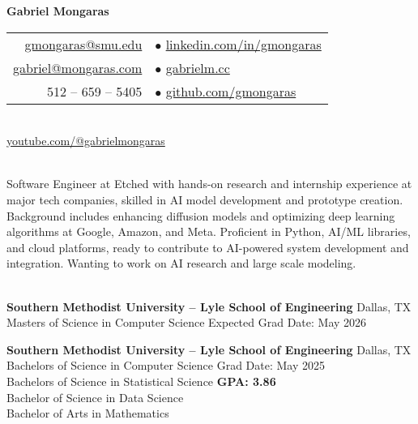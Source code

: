 \documentclass[a4paper,10pt]{article}
\begin{document}
\begin{center}
    {\LARGE \textbf{Gabriel Mongaras}} \\
    \vspace{10pt}
    \begin{tabular}{r l}
        \href{mailto:gmongaras@smu.edu}{gmongaras@smu.edu} \quad & $\bullet$ \quad \href{https://www.linkedin.com/in/gmongaras}{linkedin.com/in/gmongaras} \\
        \href{mailto:gabriel@mongaras.com}{gabriel@mongaras.com} \quad & $\bullet$ \quad \href{https://gabrielm.cc/}{gabrielm.cc} \\
        512 – 659 – 5405 \quad & $\bullet$ \quad \href{https://github.com/gmongaras}{github.com/gmongaras} \\
    \end{tabular} \\
    \href{https://www.youtube.com/@gabrielmongaras}{youtube.com/@gabrielmongaras} \\
\end{center}

\noindent\hrulefill

 \vspace{1pt} \\
Software Engineer at Etched with hands-on research and internship experience at major tech companies, skilled in AI model development and prototype creation. Background includes enhancing diffusion models and optimizing deep learning algorithms at Google, Amazon, and Meta. Proficient in Python, AI/ML libraries, and cloud platforms, ready to contribute to AI-powered system development and integration. Wanting to work on AI research and large scale modeling.

\vspace{5pt}
 \vspace{1pt} \\
\textbf{Southern Methodist University – Lyle School of Engineering} \hfill Dallas, TX \\
Masters of Science in Computer Science \hfill Expected Grad Date: May 2026

\vspace{5pt}
\noindent\textbf{Southern Methodist University – Lyle School of Engineering} \hfill Dallas, TX \\
Bachelors of Science in Computer Science \hfill Grad Date: May 2025 \\
Bachelors of Science in Statistical Science \hfill \textbf{GPA: 3.86} \\
Bachelor of Science in Data Science \\
Bachelor of Arts in Mathematics
\end{document}
